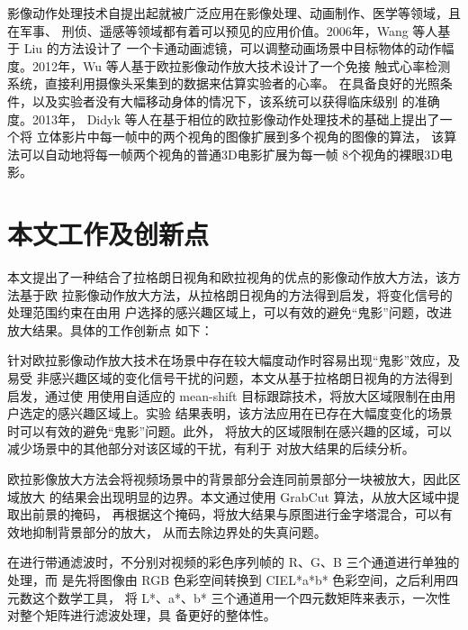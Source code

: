 影像动作处理技术自提出起就被广泛应用在影像处理、动画制作、医学等领域，且在军事、
刑侦、遥感等领域都有着可以预见的应用价值。2006年，Wang 等人基于 Liu 的方法设计了
一个卡通动画滤镜，可以调整动画场景中目标物体的动作幅
度。2012年，Wu 等人基于欧拉影像动作放大技术设计了一个免接
触式心率检测系统，直接利用摄像头采集到的数据来估算实验者的心率。
在具备良好的光照条件，以及实验者没有大幅移动身体的情况下，该系统可以获得临床级别
的准确度。2013年， Didyk 等人在基于相位的欧拉影像动作处理技术的基础上提出了一个将
立体影片中每一帧中的两个视角的图像扩展到多个视角的图像的算法，
该算法可以自动地将每一帧两个视角的普通3D电影扩展为每一帧 8个视角的裸眼3D电影。

\section{本文工作及创新点}
\label{sec:creation}

本文提出了一种结合了拉格朗日视角和欧拉视角的优点的影像动作放大方法，该方法基于欧
拉影像动作放大方法，从拉格朗日视角的方法得到启发，将变化信号的处理范围约束在由用
户选择的感兴趣区域上，可以有效的避免“鬼影”问题，改进放大结果。具体的工作创新点
如下：

\begin{compactenum}
\item %
  针对欧拉影像动作放大技术在场景中存在较大幅度动作时容易出现“鬼影”效应，及易受
  非感兴趣区域的变化信号干扰的问题，本文从基于拉格朗日视角的方法得到启发，通过使
  用使用自适应的 mean-shift 目标跟踪技术，将放大区域限制在由用户选定的感兴趣区域上。实验
  结果表明，该方法应用在已存在大幅度变化的场景时可以有效的避免“鬼影”问题。此外，
  将放大的区域限制在感兴趣的区域，可以减少场景中的其他部分对该区域的干扰，有利于
  对放大结果的后续分析。
\item %
  欧拉影像放大方法会将视频场景中的背景部分会连同前景部分一块被放大，因此区域放大
  的结果会出现明显的边界。本文通过使用 GrabCut 算法，从放大区域中提取出前景的掩码，
  再根据这个掩码，将放大结果与原图进行金字塔混合，可以有效地抑制背景部分的放大，
  从而去除边界处的失真问题。
\item %
  在进行带通滤波时，不分别对视频的彩色序列帧的 R、G、B 三个通道进行单独的处理，而
  是先将图像由 RGB 色彩空间转换到 CIEL*a*b* 色彩空间，之后利用四元数这个数学工具，
  将 L*、a*、b* 三个通道用一个四元数矩阵来表示，一次性对整个矩阵进行滤波处理，具
  备更好的整体性。
\end{compactenum}

